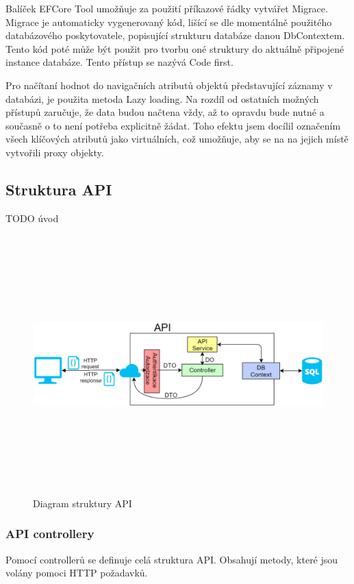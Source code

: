 \documentclass[
  biblatex,
  glossaries,
  index
]{kidiplom}
\begin{document}
Balíček EFCore Tool umožňuje za použití příkazové řádky vytvářet Migrace. Migrace je automaticky vygenerovaný kód, lišící se dle momentálně použitého databázového poskytovatele, popisující strukturu databáze danou DbContextem. Tento kód poté může být použit pro tvorbu oné struktury do aktuálně připojené instance databáze. Tento přístup se nazývá Code first.

Pro načítaní hodnot do navigačních atributů objektů představující záznamy v databázi, je použita metoda Lazy loading. Na rozdíl od ostatních možných přístupů zaručuje, že data budou načtena vždy, až to opravdu bude nutné a současně o to není potřeba explicitně žádat. Toho efektu jsem docílil označením všech klíčových atributů jako virtuálních, což umožňuje, aby se na na jejich místě vytvořili proxy objekty.

\subsection{Struktura API}
TODO úvod
\begin{figure}[H]
  	\centering
 	 \includegraphics[width=14cm,height=10cm,keepaspectratio]{API_Diagram}
 	 \caption{Diagram struktury API}
\end{figure}

\subsubsection{API controllery}
Pomocí controllerů se definuje celá struktura API. Obsahují metody, které jsou volány pomoci HTTP požadavků. 
\end{document}
